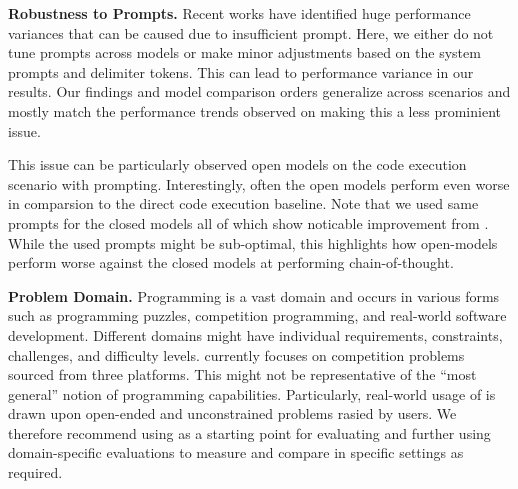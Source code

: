 \vspace{1pt}
\noindent \textbf{Robustness to Prompts.}
Recent works have identified huge performance variances that can be caused due to insufficient prompt.
Here, we either do not tune prompts across models or make minor adjustments based on the system prompts and delimiter tokens.
This can lead to performance variance in our results. 
Our findings and model comparison orders generalize across \livecodebench{} scenarios 
and mostly match the performance trends observed on \humaneval{} making this a less prominient issue.

This issue can be particularly observed open models on the code execution scenario with \chainot{} prompting.
Interestingly, often the open models perform even worse in comparsion to the direct code execution baseline.
Note that we used same prompts for the closed models all of which show noticable improvement from \chainot{}.
While the used prompts might be sub-optimal, this highlights how open-models perform worse against the closed models at performing chain-of-thought.

\vspace{1pt}
\noindent \textbf{Problem Domain.}
Programming is a vast domain and occurs in various forms such as programming puzzles, competition programming, and real-world software development.
Different domains might have individual requirements, constraints, challenges, and difficulty levels.
\livecodebench{} currently focuses on competition problems sourced from three platforms.
This might not be representative of the ``most general'' notion of \llm{} programming capabilities. 
Particularly, real-world usage of \llms{} is drawn upon open-ended and unconstrained problems rasied by users.
We therefore recommend using \livecodebench{} as a starting point for evaluating \llms{} and 
further using domain-specific evaluations to measure and compare \llms{} in specific settings as required.